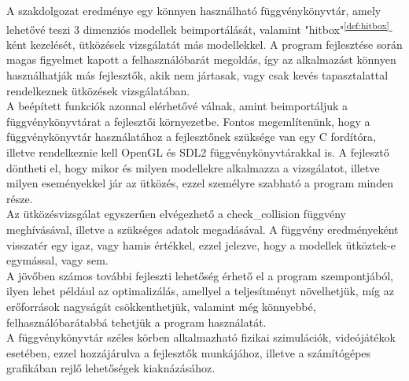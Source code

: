 
A szakdolgozat eredménye egy könnyen használható függvénykönyvtár, amely lehetővé teszi 3 dimenziós modellek beimportálását, valamint "hitbox"\textsuperscript{\ref{def:hitbox}}-ként kezelését, ütközések vizsgálatát más modellekkel. A program fejlesztése során magas figyelmet kapott a felhasználóbarát megoldás, így az alkalmazást könnyen használhatják más fejlesztők, akik nem jártasak, vagy csak kevés tapasztalattal rendelkeznek ütközések vizsgálatában.\\

A beépített funkciók azonnal elérhetővé válnak, amint beimportáljuk a függvénykönyvtárat a fejlesztői környezetbe. Fontos megemlítenünk, hogy a függvénykönyvtár használatához a fejlesztőnek szüksége van egy C fordítóra, illetve rendelkeznie kell \cite{OpenGL}{OpenGL} és \cite{SDL2}{SDL2} függvénykönyvtárakkal is. A fejlesztő döntheti el, hogy mikor és milyen modellekre alkalmazza a vizsgálatot, illetve milyen eseményekkel jár az ütközés, ezzel személyre szabható a program minden része.\\

Az ütközésvizsgálat egyszerűen elvégezhető a check\_collision függvény meghívásával, illetve a szükséges adatok megadásával. A függvény eredményeként visszatér egy igaz, vagy hamis értékkel, ezzel jelezve, hogy a modellek ütköztek-e egymással, vagy sem.\\

A jövőben számos további fejleszti lehetőség érhető el a program szempontjából, ilyen lehet például az optimalizálás, amellyel a teljesítményt növelhetjük, míg az erőforrások nagyságát csökkenthetjük, valamint még könnyebbé, felhasználóbarátabbá tehetjük a program használatát.\\

A függvénykönyvtár széles körben alkalmazható fizikai szimulációk, videójátékok esetében, ezzel hozzájárulva a fejlesztők munkájához, illetve a számítógépes grafikában rejlő lehetőségek kiaknázásához.